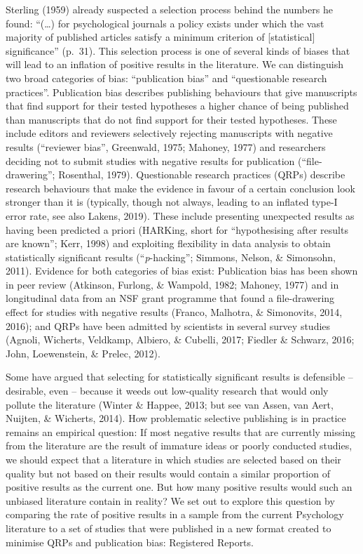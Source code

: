 \documentclass[british,,jou,floatsintext]{apa6}
\begin{document}
Sterling (1959) already suspected a selection process behind the numbers he found:
\enquote{(\ldots{}) for psychological journals a policy exists under which the vast majority of published articles satisfy a minimum criterion of {[}statistical{]} significance} (p.~31).
This selection process is one of several kinds of biases that will lead to an inflation of positive results in the literature.
We can distinguish two broad categories of bias: \enquote{publication bias} and \enquote{questionable research practices}.
Publication bias describes publishing behaviours that give manuscripts that find support for their tested hypotheses a higher chance of being published than manuscripts that do not find support for their tested hypotheses.
These include editors and reviewers selectively rejecting manuscripts with negative results (``reviewer bias'', Greenwald, 1975; Mahoney, 1977) and researchers deciding not to submit studies with negative results for publication (``file-drawering''; Rosenthal, 1979).
Questionable research practices (QRPs) describe research behaviours that make the evidence in favour of a certain conclusion look stronger than it is (typically, though not always, leading to an inflated type-I error rate, see also Lakens, 2019).
These include presenting unexpected results as having been predicted a priori (HARKing, short for ``hypothesising after results are known''; Kerr, 1998) and exploiting flexibility in data analysis to obtain statistically significant results (``\emph{p}-hacking''; Simmons, Nelson, \& Simonsohn, 2011).
Evidence for both categories of bias exist:
Publication bias has been shown in peer review (Atkinson, Furlong, \& Wampold, 1982; Mahoney, 1977) and in longitudinal data from an NSF grant programme that found a file-drawering effect for studies with negative results (Franco, Malhotra, \& Simonovits, 2014, 2016); and QRPs have been admitted by scientists in several survey studies (Agnoli, Wicherts, Veldkamp, Albiero, \& Cubelli, 2017; Fiedler \& Schwarz, 2016; John, Loewenstein, \& Prelec, 2012).

Some have argued that selecting for statistically significant results is defensible -- desirable, even -- because it weeds out low-quality research that would only pollute the literature (Winter \& Happee, 2013; but see van Assen, van Aert, Nuijten, \& Wicherts, 2014).
How problematic selective publishing is in practice remains an empirical question:
If most negative results that are currently missing from the literature are the result of immature ideas or poorly conducted studies, we should expect that a literature in which studies are selected based on their quality but not based on their results would contain a similar proportion of positive results as the current one.
But how many positive results would such an unbiased literature contain in reality?
We set out to explore this question by comparing the rate of positive results in a sample from the current Psychology literature to a set of studies that were published in a new format created to minimise QRPs and publication bias: Registered Reports.
\end{document}
